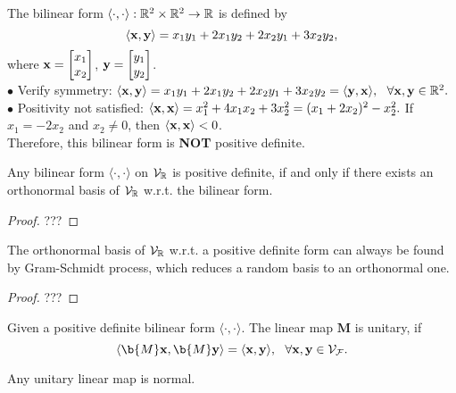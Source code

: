 \begin{example}
The bilinear form $\langle \cdot, \cdot \rangle: \mathbb{R}^2 \times \mathbb{R}^2 \to \mathbb{R}$ is defined by 
%
$$\langle \mathbf{x}, \mathbf{y} \rangle = x_1y_1 + 2x_1y_2 + 2x_2y_1 + 3x_2y_2,$$ 
%
where $\mathbf{x} =
\begin{bmatrix}
    x_1 \\
    x_2
\end{bmatrix}$, 
$\mathbf{y} = 
\begin{bmatrix}
    y_1 \\
    y_2
\end{bmatrix}
$.\\
$\bullet$ Verify symmetry: $\langle \mathbf{x}, \mathbf{y} \rangle = x_1y_1 + 2x_1y_2 + 2x_2y_1 + 3x_2y_2 = \langle \mathbf{y},\mathbf{x} \rangle, ~\ \forall \mathbf{x}, \mathbf{y} \in \mathbb{R}^2.$ \\
$\bullet$ Positivity not satisfied: $\langle \mathbf{x}, \mathbf{x} \rangle = x_1^2 + 4x_1x_2 +3x_2^2 = (x_1+2x_2)^2 - x_2^2.$
If $x_1 = -2x_2$ and $x_2 \neq 0$, then $\langle \mathbf{x}, \mathbf{x} \rangle < 0$.\\
Therefore, this bilinear form is \textbf{NOT} positive definite.
\end{example}

\begin{proposition}
Any bilinear form $\langle \cdot, \cdot \rangle$ on $\mathcal{V}_{\mathbb{R}}$ is positive definite, if and only if there exists an orthonormal basis of  $\mathcal{V}_{\mathbb{R}}$ w.r.t. the bilinear form. 
\end{proposition}
%
\begin{proof}
    ???
\end{proof}
%
\begin{remark}
The orthonormal basis of $\mathcal{V}_{\mathbb{R}}$ w.r.t. a positive definite form can always be found by Gram-Schmidt process, which reduces a random basis to an orthonormal one.
\end{remark}
%
\begin{proof}
    ???
\end{proof}
%



\begin{definition}
Given a positive definite bilinear form $\langle \cdot, \cdot \rangle$. The linear map $\bm M$ is unitary, if 
$$\langle \b{M}\x, \b{M}\y \rangle = \langle \x, \y \rangle, ~\  \forall \x,\y \in \VF. $$
\end{definition}
%
\begin{theorem}
Any unitary linear map is normal.
\end{theorem}





